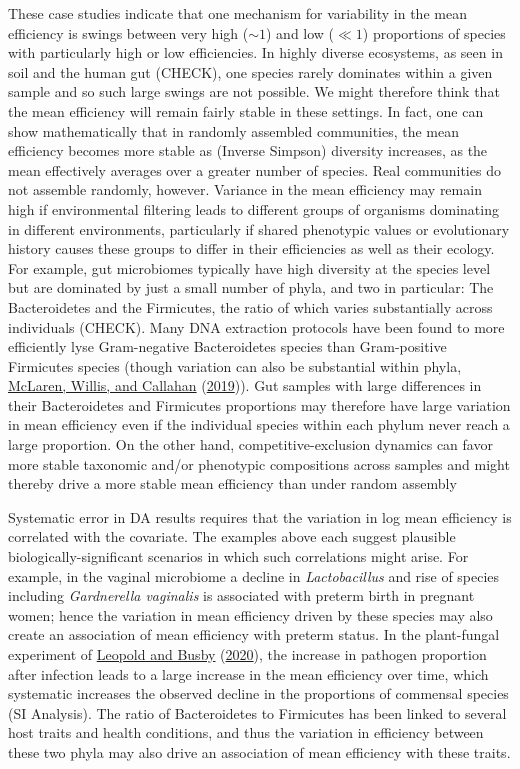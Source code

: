 \documentclass[
]{article}
\theoremstyle{definition}
\theoremstyle{definition}
\theoremstyle{definition}
\theoremstyle{definition}
\theoremstyle{remark}
\begin{document}
These case studies indicate that one mechanism for variability in the mean efficiency is swings between very high (\(\sim 1\)) and low (\(\ll 1\)) proportions of species with particularly high or low efficiencies.
In highly diverse ecosystems, as seen in soil and the human gut (CHECK), one species rarely dominates within a given sample and so such large swings are not possible.
We might therefore think that the mean efficiency will remain fairly stable in these settings.
In fact, one can show mathematically that in randomly assembled communities, the mean efficiency becomes more stable as (Inverse Simpson) diversity increases, as the mean effectively averages over a greater number of species.
Real communities do not assemble randomly, however.
Variance in the mean efficiency may remain high if environmental filtering leads to different groups of organisms dominating in different environments, particularly if shared phenotypic values or evolutionary history causes these groups to differ in their efficiencies as well as their ecology.
For example, gut microbiomes typically have high diversity at the species level but are dominated by just a small number of phyla, and two in particular: The Bacteroidetes and the Firmicutes, the ratio of which varies substantially across individuals (CHECK).
Many DNA extraction protocols have been found to more efficiently lyse Gram-negative Bacteroidetes species than Gram-positive Firmicutes species (though variation can also be substantial within phyla, \protect\hyperlink{ref-mclaren2019cons}{McLaren, Willis, and Callahan} (\protect\hyperlink{ref-mclaren2019cons}{2019})).
Gut samples with large differences in their Bacteroidetes and Firmicutes proportions may therefore have large variation in mean efficiency even if the individual species within each phylum never reach a large proportion.
On the other hand, competitive-exclusion dynamics can favor more stable taxonomic and/or phenotypic compositions across samples and might thereby drive a more stable mean efficiency than under random assembly

Systematic error in DA results requires that the variation in log mean efficiency is correlated with the covariate.
The examples above each suggest plausible biologically-significant scenarios in which such correlations might arise.
For example, in the vaginal microbiome a decline in \emph{Lactobacillus} and rise of species including \emph{Gardnerella vaginalis} is associated with preterm birth in pregnant women; hence the variation in mean efficiency driven by these species may also create an association of mean efficiency with preterm status.
In the plant-fungal experiment of \protect\hyperlink{ref-leopold2020host}{Leopold and Busby} (\protect\hyperlink{ref-leopold2020host}{2020}), the increase in pathogen proportion after infection leads to a large increase in the mean efficiency over time, which systematic increases the observed decline in the proportions of commensal species (SI Analysis).
The ratio of Bacteroidetes to Firmicutes has been linked to several host traits and health conditions, and thus the variation in efficiency between these two phyla may also drive an association of mean efficiency with these traits.
\end{document}
